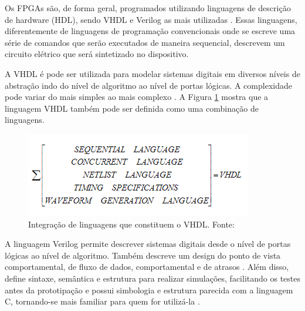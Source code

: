 Os FPGAs são, de forma geral, programados utilizando linguagens de descrição de hardware (HDL), sendo VHDL e Verilog as mais utilizadas \cite{Ain}. Essas linguagens, diferentemente de linguagens de programação convencionais onde se escreve uma série de comandos que serão executados de maneira sequencial, descrevem um circuito elétrico que será sintetizado no dispositivo.

A VHDL é pode ser utilizada para modelar sistemas digitais em diversos níveis de abstração indo do nível de algoritmo ao nível de portas lógicas. A complexidade pode variar do mais simples ao mais complexo \cite{Wunnava}. A Figura \ref{fig:Vhdl} mostra que a linguagem VHDL também pode ser definida como uma combinação de linguagens.

\begin{figure}[H]
    \centering
    \includegraphics[scale=0.8]{figures/ReferencialTeorico/Vhdl.png}
    \caption{Integração de linguagens que constituem o VHDL. Fonte: \cite{Wunnava}}
    \label{fig:Vhdl}
\end{figure}


A linguagem Verilog permite descrever sistemas digitais desde o nível de portas lógicas ao nível de algoritmo. Também descreve um design do ponto de vista comportamental, de fluxo de dados, comportamental e de atrasos \cite{Bhasker}. Além disso, define sintaxe, semântica e estrutura para realizar simulações, facilitando os testes antes da prototipação e possui simbologia e estrutura parecida com a linguagem C, tornando-se mais familiar para quem for utilizá-la \cite{Wunnava}.
